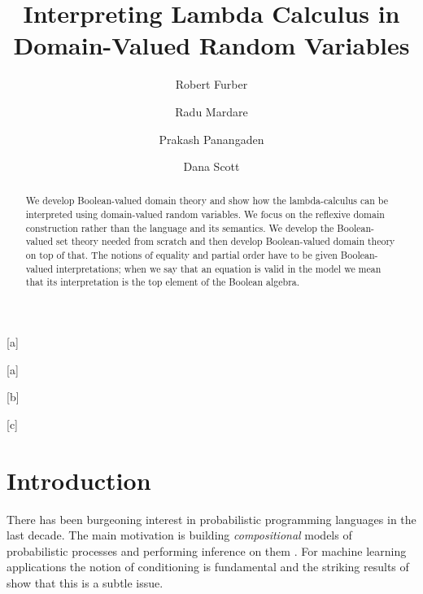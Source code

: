 \documentclass{lmcs}
\begin{document}
\title[Interpreting $\lambda$-Calculus in Random Variables]{Interpreting Lambda Calculus in Domain-Valued Random Variables} 

\author[R. Furber]{Robert Furber}[a]
\author[R. Mardare]{Radu Mardare}[a]
\author[P. Panangaden]{Prakash Panangaden}[b]
\author[D. Scott]{Dana Scott}[c]

\address{Heriot-Watt University, Scotland}

\address{McGill University, Canada}

\address{Carnegie Mellon University, USA}


\begin{abstract}
  We develop Boolean-valued domain theory and show how the lambda-calculus can be
  interpreted using domain-valued random variables. We focus on the reflexive domain
  construction rather than the language and its semantics.  We develop the Boolean-valued
  set theory needed from scratch and then develop Boolean-valued domain theory on top of
  that.  The notions of equality and partial order have to be given Boolean-valued
  interpretations; when we say that an equation is valid in the model we mean that its
  interpretation is the top element of the Boolean algebra.
\end{abstract}

\maketitle



\section{Introduction}
There has been burgeoning interest in probabilistic programming languages in the
last decade. %
The main motivation is building \emph{compositional} models of probabilistic
processes and performing inference on them \cite{Roy11,Goodman08,Wood14}. %
For machine learning applications the notion of
conditioning is fundamental and the striking results of
\cite{Ackerman11,Ackerman19} show that this is a subtle issue. 
\end{document}
